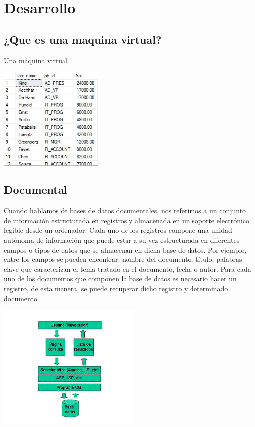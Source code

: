 \documentclass[twoside,twocolumn]{article}
\begin{document}
\section{Desarrollo}

\subsection{¿Que es una maquina virtual?}

Una máquina virtual 

\begin{center}
	\includegraphics[width=5cm]{./Imagenes/virtualizacion} 
	\end{center}




\subsection{Documental}
Cuando hablamos de bases de datos documentales, nos referimos a un conjunto de información estructurada en registros y almacenada en un soporte electrónico legible desde un ordenador. Cada uno de los registros compone una unidad autónoma de información que puede estar a su vez estructurada en diferentes campos o tipos de datos que se almacenan en dicha base de datos. Por ejemplo, entre los campos se pueden encontrar: nombre del documento, título, palabras clave que caracterizan el tema tratado en el documento, fecha o autor. Para cada uno de los documentos que componen la base de datos es necesario hacer un registro, de esta manera, se puede recuperar dicho registro y determinado documento.

\begin{center}
	\includegraphics[width=7cm]{./Imagenes/documental} 
\end{center}
\end{document}
